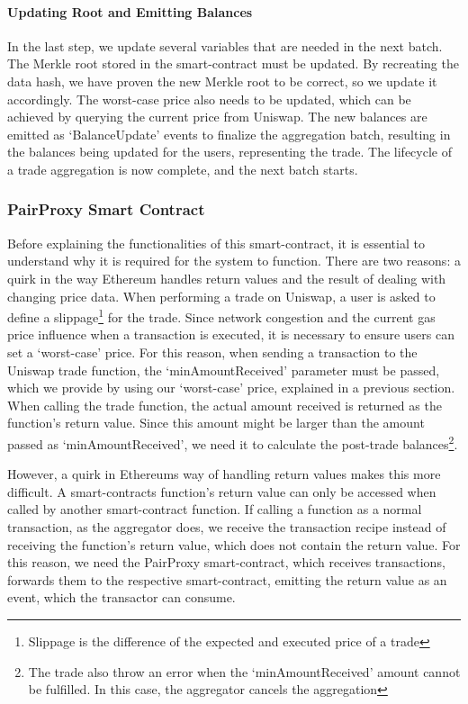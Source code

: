 \documentclass[../../thesis.tex]{subfiles}
\begin{document}
\paragraph{Updating Root and Emitting Balances}
In the last step, we update several variables that are needed in the next batch. The Merkle root stored in the smart-contract must be updated. By recreating the data hash, we have proven the new Merkle root to be correct, so we update it accordingly. The worst-case price also needs to be updated, which can be achieved by querying the current price from Uniswap. The new balances are emitted as `BalanceUpdate' events to finalize the aggregation batch, resulting in the balances being updated for the users, representing the trade. The lifecycle of a trade aggregation is now complete, and the next batch starts.

\subsubsection{PairProxy Smart Contract} \label{pairProxy}
Before explaining the functionalities of this smart-contract, it is essential to understand why it is required for the system to function. There are two reasons: a quirk in the way Ethereum handles return values and the result of dealing with changing price data.
When performing a trade on Uniswap, a user is asked to define a slippage\footnote{Slippage is the difference of the expected and executed price of a trade} for the trade. Since network congestion and the current gas price influence when a transaction is executed, it is necessary to ensure users can set a `worst-case' price. For this reason, when sending a transaction to the Uniswap trade function, the `minAmountReceived' parameter must be passed, which we provide by using our `worst-case' price, explained in a previous section. When calling the trade function, the actual amount received is returned as the function's return value. Since this amount might be larger than the amount passed as `minAmountReceived', we need it to calculate the post-trade balances\footnote{The trade also throw an error when the `minAmountReceived' amount cannot be fulfilled. In this case, the aggregator cancels the aggregation}. 

However, a quirk in Ethereums way of handling return values makes this more difficult. A smart-contracts function's return value can only be accessed when called by another smart-contract function. If calling a function as a normal transaction, as the aggregator does, we receive the transaction recipe instead of receiving the function's return value, which does not contain the return value. For this reason, we need the PairProxy smart-contract, which receives transactions, forwards them to the respective smart-contract, emitting the return value as an event, which the transactor can consume. 
\end{document}
